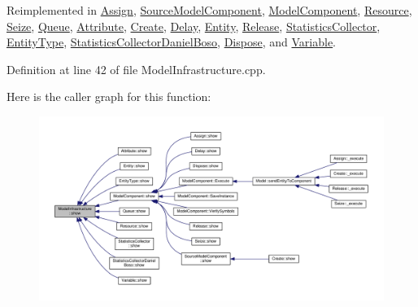 Reimplemented in \hyperlink{class_assign_af5022b92204adcd9ee3e444b7e316d07}{Assign}, \hyperlink{class_source_model_component_a4011597b5780fcc0495e8e22ab8158f6}{Source\-Model\-Component}, \hyperlink{class_model_component_ad8bc846e36b028eab7efb7da6c549eca}{Model\-Component}, \hyperlink{class_resource_a593cf83404dc90706943b4e60213fd01}{Resource}, \hyperlink{class_seize_a495ace3a156680b5816c8b285135322c}{Seize}, \hyperlink{class_queue_ac78cc84cd91539c7f38d95dc17dabac5}{Queue}, \hyperlink{class_attribute_aa29f79466bd6ed5e36c402ec57cb2050}{Attribute}, \hyperlink{class_create_a8d1832d2165bbeea4a5a88aded883f86}{Create}, \hyperlink{class_delay_af8187e4515417b547dc22b5ee0a1f95d}{Delay}, \hyperlink{class_entity_a86cc324050b451b31b134943e7978e36}{Entity}, \hyperlink{class_release_a1ec7b35553820f0f228f31be1df468c3}{Release}, \hyperlink{class_statistics_collector_a7ce8dad7e29d06c73a01d2ddee93fe00}{Statistics\-Collector}, \hyperlink{class_entity_type_ab5a696912b12a9f51decded90f368dea}{Entity\-Type}, \hyperlink{class_statistics_collector_daniel_boso_a38d1fe032f94a4626eb997ae75c04e74}{Statistics\-Collector\-Daniel\-Boso}, \hyperlink{class_dispose_aee8ef98d5ca22eb18a97b258ed059865}{Dispose}, and \hyperlink{class_variable_a8bd0a772bb32fd630e252306306cd154}{Variable}.



Definition at line 42 of file Model\-Infrastructure.\-cpp.



Here is the caller graph for this function\-:
\nopagebreak
\begin{figure}[H]
\begin{center}
\leavevmode
\includegraphics[width=350pt]{class_model_infrastructure_a649a5a89a0c9931783d3c51de2acf266_icgraph}
\end{center}
\end{figure}


